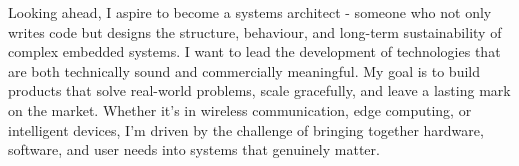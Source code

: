 
Looking ahead, I aspire to become a systems architect - someone who not only writes code but designs the structure, behaviour, and long-term sustainability of complex embedded systems.
I want to lead the development of technologies that are both technically sound and commercially meaningful.
My goal is to build products that solve real-world problems, scale gracefully, and leave a lasting mark on the market.
Whether it's in wireless communication, edge computing, or intelligent devices, I'm driven by the challenge of bringing together hardware, software, and user needs into systems that genuinely matter.
